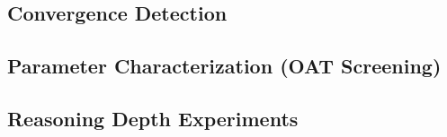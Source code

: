 \subsection{Convergence Detection}
%
%
%

\subsection{Parameter Characterization (OAT Screening)}
%

\subsection{Reasoning Depth Experiments}


